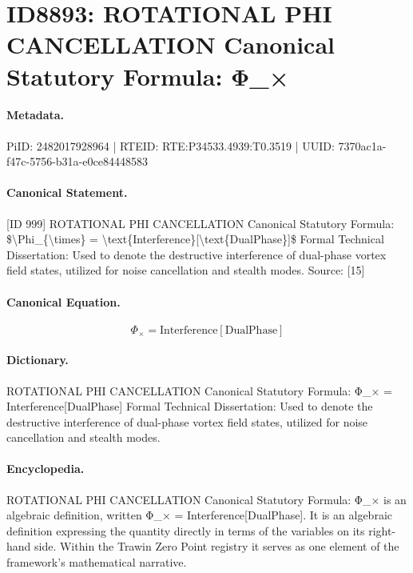 \section*{ID8893: ROTATIONAL PHI CANCELLATION Canonical Statutory Formula: Φ\_×}
\paragraph{Metadata.}
PiID: 2482017928964 | RTEID: RTE:P34533.4939:T0.3519 | UUID: 7370ac1a-f47c-5756-b31a-e0ce84448583

\paragraph{Canonical Statement.}
[ID 999] ROTATIONAL PHI CANCELLATION Canonical Statutory Formula: \$\textbackslash{}Phi\_\{\textbackslash{}times\} = \textbackslash{}text\{Interference\}[\textbackslash{}text\{DualPhase\}]\$ Formal Technical Dissertation: Used to denote the destructive interference of dual-phase vortex field states, utilized for noise cancellation and stealth modes. Source: [15]

\paragraph{Canonical Equation.}
\[
\Phi_{\times} = \text{Interference}[\text{DualPhase}]
\]

\paragraph{Dictionary.}
ROTATIONAL PHI CANCELLATION Canonical Statutory Formula: Φ\_× = Interference[DualPhase] Formal Technical Dissertation: Used to denote the destructive interference of dual-phase vortex field states, utilized for noise cancellation and stealth modes.

\paragraph{Encyclopedia.}
ROTATIONAL PHI CANCELLATION Canonical Statutory Formula: Φ\_× is an algebraic definition, written Φ\_× = Interference[DualPhase]. It is an algebraic definition expressing the quantity directly in terms of the variables on its right-hand side. Within the Trawin Zero Point registry it serves as one element of the framework's mathematical narrative.
